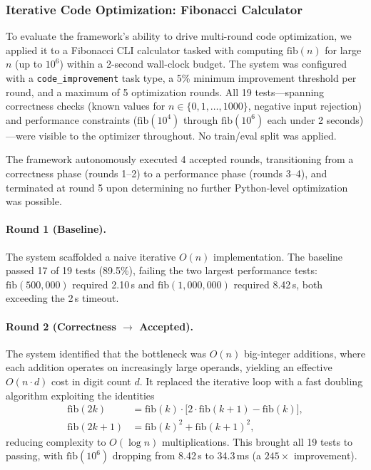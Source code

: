 \subsubsection{Iterative Code Optimization: Fibonacci Calculator}
\label{sec:experiment-fibonacci}

To evaluate the framework's ability to drive multi-round code optimization, we applied it to a Fibonacci CLI calculator tasked with computing $\mathrm{fib}(n)$ for large $n$ (up to $10^6$) within a 2-second wall-clock budget. The system was configured with a \texttt{code\_improvement} task type, a 5\% minimum improvement threshold per round, and a maximum of 5 optimization rounds. All 19 tests---spanning correctness checks (known values for $n \in \{0, 1, \ldots, 1000\}$, negative input rejection) and performance constraints ($\mathrm{fib}(10^4)$ through $\mathrm{fib}(10^6)$ each under 2 seconds)---were visible to the optimizer throughout. No train/eval split was applied.

The framework autonomously executed 4 accepted rounds, transitioning from a correctness phase (rounds 1--2) to a performance phase (rounds 3--4), and terminated at round 5 upon determining no further Python-level optimization was possible.

\paragraph{Round 1 (Baseline).}
The system scaffolded a naive iterative $O(n)$ implementation. The baseline passed 17 of 19 tests (89.5\%), failing the two largest performance tests: $\mathrm{fib}(500{,}000)$ required 2.10\,s and $\mathrm{fib}(1{,}000{,}000)$ required 8.42\,s, both exceeding the 2\,s timeout.

\paragraph{Round 2 (Correctness $\to$ Accepted).}
The system identified that the bottleneck was $O(n)$ big-integer additions, where each addition operates on increasingly large operands, yielding an effective $O(n \cdot d)$ cost in digit count $d$. It replaced the iterative loop with a fast doubling algorithm exploiting the identities
\begin{align}
  \mathrm{fib}(2k) &= \mathrm{fib}(k) \cdot \bigl[2 \cdot \mathrm{fib}(k+1) - \mathrm{fib}(k)\bigr], \\
  \mathrm{fib}(2k+1) &= \mathrm{fib}(k)^2 + \mathrm{fib}(k+1)^2,
\end{align}
reducing complexity to $O(\log n)$ multiplications. This brought all 19 tests to passing, with $\mathrm{fib}(10^6)$ dropping from 8.42\,s to 34.3\,ms (a $245\times$ improvement).

